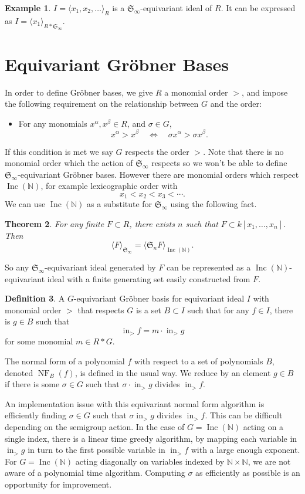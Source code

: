 \documentclass{amsart}
\newtheorem{theorem}{Theorem}[section]
\theoremstyle{definition}
\newtheorem{definition}[theorem]{Definition}
\newtheorem{example}[theorem]{Example}
\theoremstyle{remark}
\numberwithin{equation}{section}
\newcommand{\B}[1]{\mathbb #1}
\newcommand{\F}[1]{\mathfrak #1}
\newcommand{\<}{\langle}
\renewcommand{\>}{\rangle}
\newcommand{\ideal}[1]{\langle #1 \rangle}
\newcommand{\LT}{\operatorname{in}_>}
\newcommand{\Inc}{\operatorname{Inc}(\B N)}
\newcommand{\NF}{\operatorname{NF}}
\begin{document}
\begin{example}
$I = \<x_1,x_2,\ldots\>_R$ is a $\F S_\infty$-equivariant ideal of $R$.  It can be expressed as $I= \<x_1\>_{R*\F S_\infty}$.
\end{example}

\section{Equivariant Gr\"obner Bases}
In order to define Gr\"obner bases, we give $R$ a monomial order $>$, and impose the following requirement on the relationship between $G$ and the order:
\begin{itemize}
 \item For any monomials $x^\alpha, x^\beta \in R$, and $\sigma \in G$,
\[ x^\alpha > x^\beta \quad \Leftrightarrow \quad \sigma x^\alpha > \sigma x^\beta. \]
\end{itemize}
If this condition is met we say $G$ respects the order $>$.
Note that there is no monomial order which the action of $\F S_\infty$ respects so we won't be able to define $\F S_\infty$-equivariant Gr\"obner bases.  However there are monomial orders which respect $\Inc$, for example lexicographic order with
\[x_1 < x_2 < x_3 < \cdots.\]
We can use $\Inc$ as a substitute for $\F S_\infty$ using the following fact.
\begin{theorem}
For any finite $F \subset R$, there exists $n$ such that $F \subset k[x_1,\ldots,x_n]$.  Then
 \[ \ideal{F}_{\F S_\infty} = \ideal{\F S_n F}_{\Inc}. \]
\end{theorem}
So any $\F S_\infty$-equivariant ideal generated by $F$ can be represented as a $\Inc$-equivariant ideal with a finite generating set easily constructed from $F$.


\begin{definition}
 A $G$-equivariant Gr\"obner basis for equivariant ideal $I$ with monomial order $>$ that respects $G$ is a set $B \subset I$ such that for any $f \in I$, there is $g \in B$ such that
  \[ \LT f = m\cdot \LT g \]
 for some monomial $m \in R*G$. 
\end{definition}

The normal form of a polynomial $f$ with respect to a set of polynomials $B$, denoted $\NF_B(f)$, is defined in the usual way.  We reduce by an element $g \in B$ if there is some $\sigma \in G$ such that $\sigma \cdot \LT g$ divides $\LT f$.

An implementation issue with this equivariant normal form algorithm is efficiently finding $\sigma \in G$ such that $\sigma \LT g$ divides $\LT f$.  This can be difficult depending on the semigroup action.  In the case of $G = \Inc$ acting on a single index, there is a linear time greedy algorithm, by mapping each variable in $\LT g$ in turn to the first possible variable in $\LT f$ with a large enough exponent.  For $G = \Inc$ acting diagonally on variables indexed by $\B N \times \B N$, we are not aware of a polynomial time algorithm.  Computing $\sigma$ as efficiently as possible is an opportunity for improvement.
\end{document}
